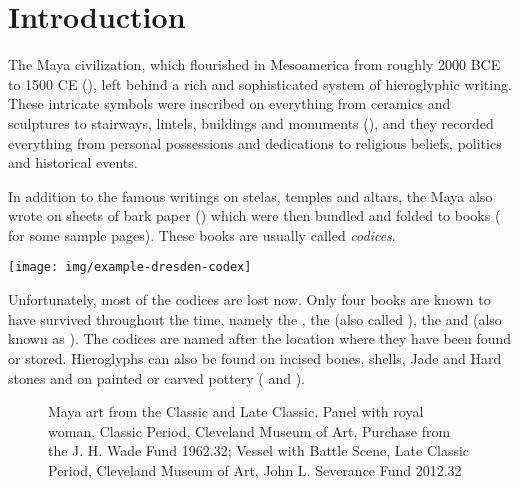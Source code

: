 \documentclass[../main.tex]{subfiles}
\begin{document}
\chapter{Introduction}
The Maya civilization, which flourished in Mesoamerica from roughly 2000 BCE to 1500 CE 
(\cite[3]{estrada-belli2011}), 
left behind a rich and sophisticated system of hieroglyphic writing. 
These intricate symbols were inscribed on everything from ceramics and sculptures to stairways,
lintels, buildings and monuments (\cite[\ppno~17--27]{thompson1962}), and they recorded everything 
from personal possessions and dedications to religious beliefs, politics and historical events.

In addition to the famous writings on stelas, temples and altars, the Maya also wrote on sheets of 
bark paper (\cite[34\psq]{vonhagen1944}) which were then bundled and 
folded to books ( for some sample pages).
These books are usually called \emph{codices}.
\begin{center}
    \texttt{[image: img/example-dresden-codex]}
    \label{fig:introduction-example-dresden-codex}
\end{center}
Unfortunately, most of the codices are lost now.
Only four books are known to have survived throughout the time, 
namely the \dresdencodex, the \madridcodex (also called \troanocodex),
the \pariscodex and \mayamexicocodex(also known as \groliercodex).
The codices are named after the location where they have been found or stored.
Hieroglyphs can also be found on incised bones, shells, Jade and Hard stones and on painted or 
carved pottery ( and
).
\begin{figure}
    \centering
    \hfill
    \caption[Maya art from the Classic and Late Classic]{Maya art from the Classic and Late Classic.
              Panel with royal woman, 
             Classic Period, Cleveland Museum of Art, Purchase from the J. H. Wade Fund 1962.32;
              Vessel with Battle Scene, 
             Late Classic Period, Cleveland Museum of Art, John L. Severance Fund 2012.32}
\end{figure}
\end{document}
